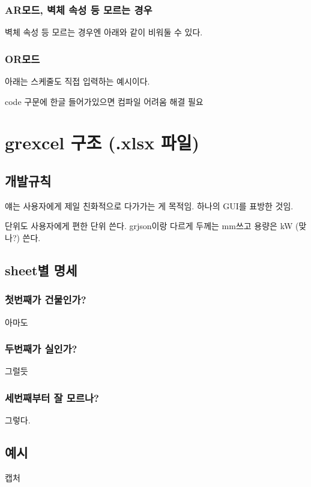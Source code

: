 \subsubsection{AR모드, 벽체 속성 등 모르는 경우}

벽체 속성 등 모르는 경우엔 아래와 같이 비워둘 수 있다.

\subsubsection{OR모드}

아래는 스케줄도 직접 입력하는 예시이다. \par

code 구문에 한글 들어가있으면 컴파일 어려움 해결 필요


\section{grexcel 구조 (.xlsx 파일)}
\subsection{개발규칙}
얘는 사용자에게 제일 친화적으로 다가가는 게 목적임. 하나의 GUI를 표방한 것임. \par
단위도 사용자에게 편한 단위 쓴다. grjson이랑 다르게 두께는 mm쓰고 용량은 kW (맞나?) 쓴다.

\subsection{sheet별 명세}
\subsubsection{첫번째가 건물인가?}
아마도
\subsubsection{두번째가 실인가?}
그럴듯
\subsubsection{세번째부터 잘 모르나?}
그렇다.
\subsection{예시}
캡처
